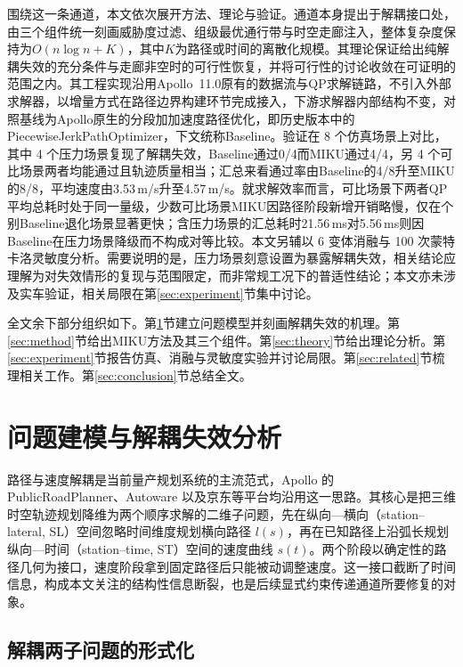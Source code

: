 \documentclass[a4paper,11pt]{ctexart}
\theoremstyle{definition}
\begin{document}
围绕这一条通道，本文依次展开方法、理论与验证。通道本身提出于解耦接口处，由三个组件统一刻画威胁度过滤、组级最优通行带与时空走廊注入，整体复杂度保持为$O(n\log n + K)$，其中$K$为路径或时间的离散化规模。其理论保证给出纯解耦失效的充分条件与走廊非空时的可行性恢复，并将可行性的讨论收敛在可证明的范围之内。其工程实现沿用Apollo~11.0原有的数据流与QP求解链路，不引入外部求解器，以增量方式在路径边界构建环节完成接入，下游求解器内部结构不变，对照基线为Apollo原生的分段加加速度路径优化，即历史版本中的PiecewiseJerkPathOptimizer，下文统称Baseline。验证在 8 个仿真场景上对比，其中 4 个压力场景复现了解耦失效，Baseline通过0/4而MIKU通过4/4，另 4 个可比场景两者均能通过且轨迹质量相当；汇总来看通过率由Baseline的4/8升至MIKU的8/8，平均速度由3.53\,m/s升至4.57\,m/s。就求解效率而言，可比场景下两者QP平均总耗时处于同一量级，少数可比场景MIKU因路径阶段新增开销略慢，仅在个别Baseline退化场景显著更快；含压力场景的汇总耗时21.56\,ms对5.56\,ms则因Baseline在压力场景降级而不构成对等比较。本文另辅以 6 变体消融与 100 次蒙特卡洛灵敏度分析。需要说明的是，压力场景刻意设置为暴露解耦失效，相关结论应理解为对失效情形的复现与范围限定，而非常规工况下的普适性结论；本文亦未涉及实车验证，相关局限在第\ref{sec:experiment}节集中讨论。

全文余下部分组织如下。第\ref{sec:problem}节建立问题模型并刻画解耦失效的机理。第\ref{sec:method}节给出MIKU方法及其三个组件。第\ref{sec:theory}节给出理论分析。第\ref{sec:experiment}节报告仿真、消融与灵敏度实验并讨论局限。第\ref{sec:related}节梳理相关工作。第\ref{sec:conclusion}节总结全文。

\section{问题建模与解耦失效分析}
\label{sec:problem}

路径与速度解耦是当前量产规划系统的主流范式，Apollo 的 PublicRoadPlanner、Autoware 以及京东等平台均沿用这一思路。其核心是把三维时空轨迹规划降维为两个顺序求解的二维子问题，先在纵向—横向（station--lateral, SL）空间忽略时间维度规划横向路径 $l(s)$，再在已知路径上沿弧长规划纵向—时间（station--time, ST）空间的速度曲线 $s(t)$。两个阶段以确定性的路径几何为接口，速度阶段拿到固定路径后只能被动调整速度。这一接口截断了时间信息，构成本文关注的结构性信息断裂，也是后续显式约束传递通道所要修复的对象。

\subsection{解耦两子问题的形式化}
\label{subsec:decouple_formalize}
\end{document}
